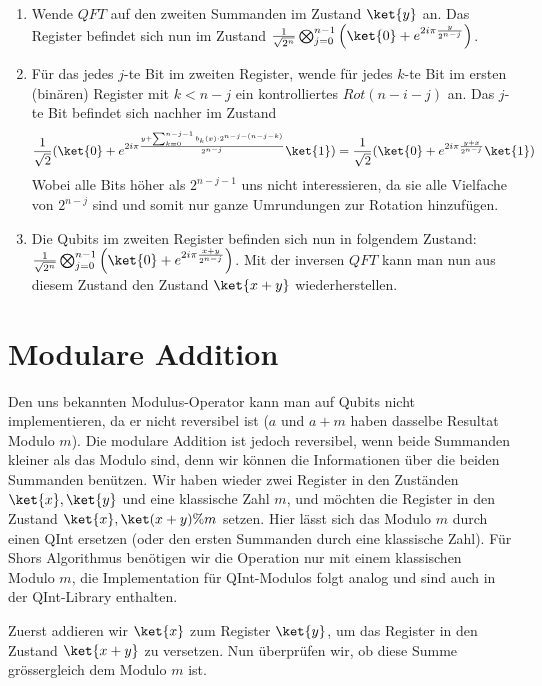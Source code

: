 \begin{enumerate}
    \item Wende $QFT$ auf den zweiten Summanden im Zustand $\ket{y}$ an. Das Register befindet sich nun im Zustand $\frac{1}{\sqrt{2^n}}\bigotimes_{j = 0}^{n - 1}\left(\ket{0} + e^{2i\pi\frac{y}{2^{n - j}}}\right)$.
    \item Für das jedes $j$-te Bit im zweiten Register, wende für jedes $k$-te Bit im ersten (binären) Register mit $k < n - j$ ein kontrolliertes $Rot(n - i - j)$ an. Das $j$-te Bit befindet sich nachher im Zustand 
    \begin{align*}
        \frac{1}{\sqrt{2}}(\ket{0} + e^{2i\pi\frac{y + \sum_{k = 0}^{n - j - 1}{b_k(x)\cdot 2^{n - j - (n - j - k)}}}{2^{n - j}}}\ket{1})
        = \frac{1}{\sqrt{2}}(\ket{0} + e^{2i\pi\frac{y + x}{2^{n - j}}}\ket{1})
    \end{align*}
    Wobei alle Bits höher als $2^{n - j - 1}$ uns nicht interessieren, da sie alle Vielfache von $2^{n - j}$ sind und somit nur ganze Umrundungen zur Rotation hinzufügen.
    \item Die Qubits im zweiten Register befinden sich nun in folgendem Zustand: $\frac{1}{\sqrt{2^n}}\bigotimes_{j = 0}^{n - 1}\left(\ket{0} + e^{2i\pi\frac{x + y}{2^{n - j}}}\right)$. Mit der inversen $QFT$ kann man nun aus diesem Zustand den Zustand $\ket{x + y}$ wiederherstellen.
\end{enumerate}
\section{Modulare Addition}
Den uns bekannten Modulus-Operator kann man auf Qubits nicht implementieren, da er nicht reversibel ist ($a$ und $a + m$ haben dasselbe Resultat Modulo $m$). Die modulare Addition ist jedoch reversibel, wenn beide Summanden kleiner als das Modulo sind, denn wir können die Informationen über die beiden Summanden benützen. Wir haben wieder zwei Register in den Zuständen $\ket{x}, \ket{y}$ und eine klassische Zahl $m$, und möchten die Register in den Zustand $\ket{x}, \ket{(x + y) \% m}$ setzen. Hier lässt sich das Modulo $m$ durch einen QInt ersetzen (oder den ersten Summanden durch eine klassische Zahl). Für Shors Algorithmus benötigen wir die Operation nur mit einem klassischen Modulo $m$, die Implementation für QInt-Modulos folgt analog und sind auch in der QInt-Library enthalten.

Zuerst addieren wir $\ket{x}$ zum Register $\ket{y}$, um das Register in den Zustand $\ket{x + y}$ zu versetzen. Nun überprüfen wir, ob diese Summe grössergleich dem Modulo $m$ ist. 

